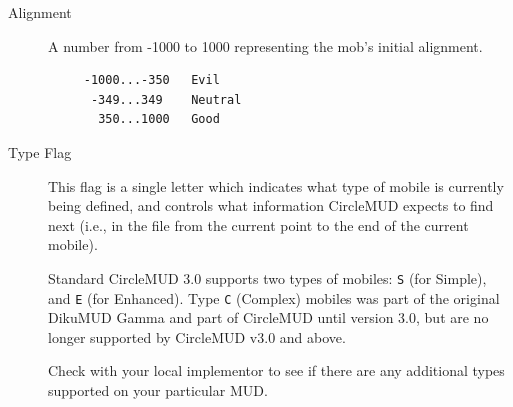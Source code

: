\documentclass[11pt]{article}
\begin{document}
\begin{description}
\item[Alignment] A number from -1000 to 1000 representing the mob's initial alignment.
\begin{verbatim}
     -1000...-350   Evil
      -349...349    Neutral
       350...1000   Good
\end{verbatim}
\item[Type Flag] This flag is a single letter which indicates what type of mobile is currently being defined, and controls what information CircleMUD expects to find next (i.e., in the file from the current point to the end of the current mobile).
\par
Standard CircleMUD 3.0 supports two types of mobiles: \texttt{S} (for Simple), and \texttt{E} (for Enhanced).  Type \texttt{C} (Complex) mobiles was part of the original DikuMUD Gamma and part of CircleMUD until version 3.0, but are no longer supported by CircleMUD v3.0 and above.
\par
Check with your local implementor to see if there are any additional types supported on your particular MUD.
\end{description}
\end{document}
